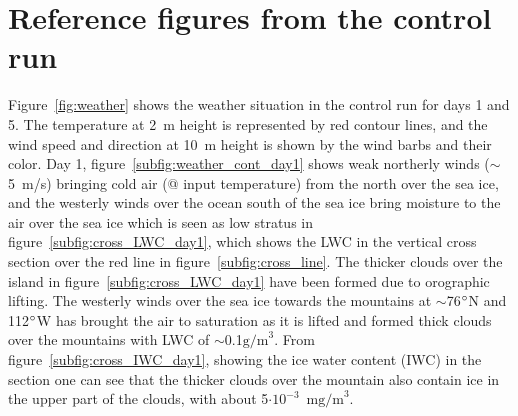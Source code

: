 \section{Reference figures from the control run}
Figure~\ref{fig:weather} shows the weather situation in the control run for days 1 and 5. The temperature at 2~m height is represented by red contour lines, and the wind speed and direction at 10~m height is shown by the 
wind barbs and their color. Day 1, figure~\ref{subfig:weather_cont_day1} shows weak northerly winds ($\sim$ 5~m/s) bringing cold air (@ input temperature) from the north over the sea ice, and the westerly winds over the ocean south of the sea ice bring moisture to the air over the sea ice which is seen as low stratus in figure~\ref{subfig:cross_LWC_day1}, which shows the LWC in the vertical cross section over the red line in figure~\ref{subfig:cross_line}. The thicker clouds over the island in figure~\ref{subfig:cross_LWC_day1} have been formed due to orographic lifting. The westerly winds over the sea ice towards the mountains at $\sim$76$\degree$N and 112$\degree$W has brought the air to saturation as it is lifted and formed thick clouds over the mountains with LWC of $\sim$0.1$\text{g/m}^3$. From figure~\ref{subfig:cross_IWC_day1}, showing the ice water content (IWC) in the section one can see that the thicker clouds over the mountain also contain ice in the upper part of the clouds, with about 5$\cdot\text{10}^{-3}$~$\text{mg/m}^3$. 

